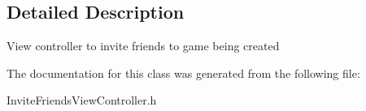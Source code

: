 \subsection{Detailed Description}
View controller to invite friends to game being created 

The documentation for this class was generated from the following file\+:\begin{DoxyCompactItemize}
\item 
Invite\+Friends\+View\+Controller.\+h\end{DoxyCompactItemize}
